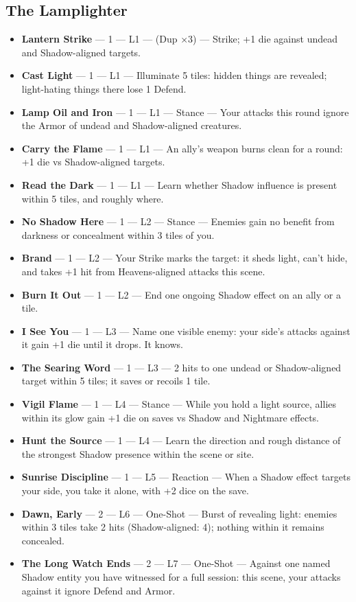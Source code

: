 \subsection{The Lamplighter}
\begin{itemize}
    \item \textbf{Lantern Strike} --- 1 --- L1 --- (Dup ×3) --- Strike; +1 die against undead and Shadow-aligned targets.
    \item \textbf{Cast Light} --- 1 --- L1 --- Illuminate 5 tiles: hidden things are revealed; light-hating things there lose 1 Defend.
    \item \textbf{Lamp Oil and Iron} --- 1 --- L1 --- Stance --- Your attacks this round ignore the Armor of undead and Shadow-aligned creatures.
    \item \textbf{Carry the Flame} --- 1 --- L1 --- An ally's weapon burns clean for a round: +1 die vs Shadow-aligned targets.
    \item \textbf{Read the Dark} --- 1 --- L1 --- Learn whether Shadow influence is present within 5 tiles, and roughly where.
    \item \textbf{No Shadow Here} --- 1 --- L2 --- Stance --- Enemies gain no benefit from darkness or concealment within 3 tiles of you.
    \item \textbf{Brand} --- 1 --- L2 --- Your Strike marks the target: it sheds light, can't hide, and takes +1 hit from Heavens-aligned attacks this scene.
    \item \textbf{Burn It Out} --- 1 --- L2 --- End one ongoing Shadow effect on an ally or a tile.
    \item \textbf{I See You} --- 1 --- L3 --- Name one visible enemy: your side's attacks against it gain +1 die until it drops. It knows.
    \item \textbf{The Searing Word} --- 1 --- L3 --- 2 hits to one undead or Shadow-aligned target within 5 tiles; it saves or recoils 1 tile.
    \item \textbf{Vigil Flame} --- 1 --- L4 --- Stance --- While you hold a light source, allies within its glow gain +1 die on saves vs Shadow and Nightmare effects.
    \item \textbf{Hunt the Source} --- 1 --- L4 --- Learn the direction and rough distance of the strongest Shadow presence within the scene or site.
    \item \textbf{Sunrise Discipline} --- 1 --- L5 --- Reaction --- When a Shadow effect targets your side, you take it alone, with +2 dice on the save.
    \item \textbf{Dawn, Early} --- 2 --- L6 --- One-Shot --- Burst of revealing light: enemies within 3 tiles take 2 hits (Shadow-aligned: 4); nothing within it remains concealed.
    \item \textbf{The Long Watch Ends} --- 2 --- L7 --- One-Shot --- Against one named Shadow entity you have witnessed for a full session: this scene, your attacks against it ignore Defend and Armor.
\end{itemize}

